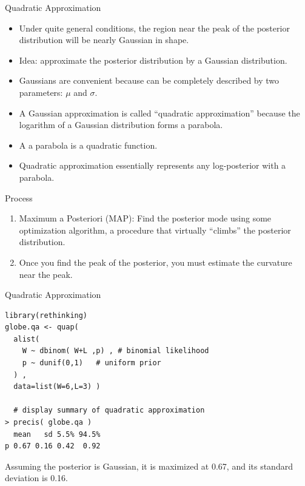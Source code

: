 \documentclass[handout]{beamer}
\begin{document}
\begin{frame}{Quadratic Approximation}
\scriptsize{

\begin{itemize}
\item Under quite general conditions, the region near the peak of the posterior distribution will be nearly Gaussian in shape.
\item Idea: approximate the posterior distribution by a Gaussian distribution.
\item Gaussians are convenient because can be completely described by two parameters: $\mu$ and $\sigma$. 
\item A Gaussian approximation is called ``quadratic approximation'' because the logarithm of
a Gaussian distribution forms a parabola. 
\item A a parabola is a quadratic function.
\item Quadratic approximation essentially represents any log-posterior with a parabola.
\end{itemize}


\begin{block}{Process}
\begin{enumerate}
  \item Maximum a Posteriori (MAP): Find the posterior mode using some optimization algorithm, a procedure that virtually “climbs” the posterior distribution.
  \item Once you find the peak of the posterior, you must estimate the curvature near the
peak.
\end{enumerate}
\end{block}


} 

\end{frame}



\begin{frame}[fragile]{Quadratic Approximation}
\begin{scriptsize}
 \begin{verbatim}
library(rethinking)
globe.qa <- quap(
  alist(
    W ~ dbinom( W+L ,p) , # binomial likelihood
    p ~ dunif(0,1)   # uniform prior
  ) ,
  data=list(W=6,L=3) )

  # display summary of quadratic approximation
> precis( globe.qa )
  mean   sd 5.5% 94.5%
p 0.67 0.16 0.42  0.92

\end{verbatim}
Assuming the posterior is Gaussian, it is maximized at 0.67, and its standard deviation is 0.16.
\end{scriptsize}


\end{frame}
\end{document}
